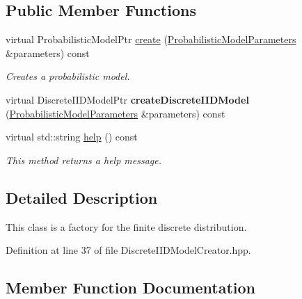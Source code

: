 \subsection*{Public Member Functions}
\begin{DoxyCompactItemize}
\item 
virtual Probabilistic\+Model\+Ptr \hyperlink{classtops_1_1DiscreteIIDModelCreator_a3eeca79afe4c57388385fed4299421d6}{create} (\hyperlink{classtops_1_1ProbabilisticModelParameters}{Probabilistic\+Model\+Parameters} \&parameters) const
\begin{DoxyCompactList}\small\item\em Creates a probabilistic model. \end{DoxyCompactList}\item 
\mbox{\label{classtops_1_1DiscreteIIDModelCreator_a192c687e49763a08045f9c2d6728a6ed}} 
virtual Discrete\+I\+I\+D\+Model\+Ptr {\bfseries create\+Discrete\+I\+I\+D\+Model} (\hyperlink{classtops_1_1ProbabilisticModelParameters}{Probabilistic\+Model\+Parameters} \&parameters) const
\item 
\mbox{\label{classtops_1_1DiscreteIIDModelCreator_afc22fa730452ff88495f66341ffbfb34}} 
virtual std\+::string \hyperlink{classtops_1_1DiscreteIIDModelCreator_afc22fa730452ff88495f66341ffbfb34}{help} () const
\begin{DoxyCompactList}\small\item\em This method returns a help message. \end{DoxyCompactList}\end{DoxyCompactItemize}


\subsection{Detailed Description}
This class is a factory for the finite discrete distribution. 

Definition at line 37 of file Discrete\+I\+I\+D\+Model\+Creator.\+hpp.



\subsection{Member Function Documentation}
\mbox{\label{classtops_1_1DiscreteIIDModelCreator_a3eeca79afe4c57388385fed4299421d6}} 
